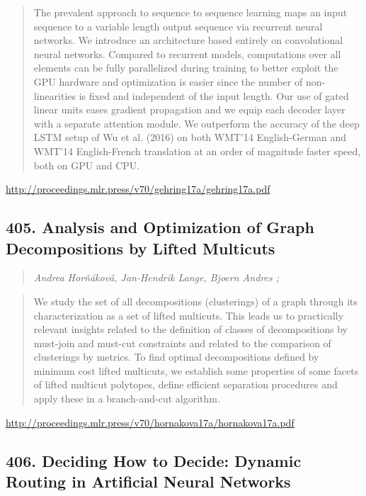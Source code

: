 \documentclass{article}
\begin{document}
\begin{quote}
    The prevalent approach to sequence to sequence learning maps an input sequence to a variable length output sequence via recurrent neural networks. We introduce an architecture based entirely on convolutional neural networks. Compared to recurrent models, computations over all elements can be fully parallelized during training to better exploit the GPU hardware and optimization is easier since the number of non-linearities is fixed and independent of the input length. Our use of gated linear units eases gradient propagation and we equip each decoder layer with a separate attention module. We outperform the accuracy of the deep LSTM setup of Wu et al. (2016) on both WMT’14 English-German and WMT’14 English-French translation at an order of magnitude faster speed, both on GPU and CPU.  
\end{quote}

\href{http://proceedings.mlr.press/v70/gehring17a/gehring17a.pdf}{http://proceedings.mlr.press/v70/gehring17a/gehring17a.pdf}

\subsection{405. Analysis and Optimization of Graph Decompositions by Lifted Multicuts}

\begin{quote}
\footnotesize{\textit{Andrea Horňáková, Jan-Hendrik Lange, Bjoern Andres ;}}

\end{quote}

\begin{quote}
    We study the set of all decompositions (clusterings) of a graph through its characterization as a set of lifted multicuts. This leads us to practically relevant insights related to the definition of classes of decompositions by must-join and must-cut constraints and related to the comparison of clusterings by metrics. To find optimal decompositions defined by minimum cost lifted multicuts, we establish some properties of some facets of lifted multicut polytopes, define efficient separation procedures and apply these in a branch-and-cut algorithm.  
\end{quote}

\href{http://proceedings.mlr.press/v70/hornakova17a/hornakova17a.pdf}{http://proceedings.mlr.press/v70/hornakova17a/hornakova17a.pdf}

\subsection{406. Deciding How to Decide: Dynamic Routing in Artificial Neural Networks}
\end{document}

